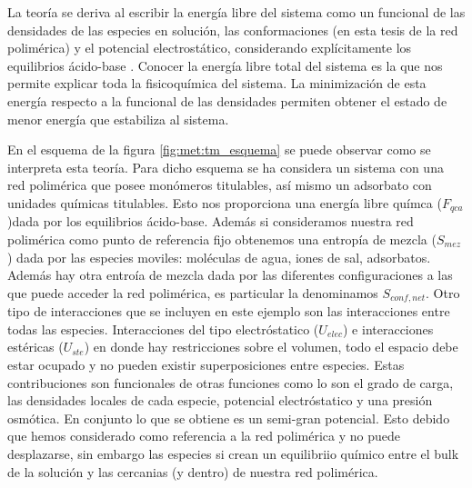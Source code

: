 La teor\'ia se deriva al escribir la energ\'ia libre del sistema como un funcional de las densidades de las especies en soluci\'on, las conformaciones (en esta tesis de la red polim\'erica) y el potencial electrost\'atico, considerando expl\'icitamente los equilibrios \'acido-base . 
Conocer la energ\'ia libre total del sistema es la que nos permite explicar toda la fisicoqu\'imica del sistema.  La minimizaci\'on de esta energ\'ia respecto a la funcional de las densidades permiten obtener el estado de menor energ\'ia que estabiliza al sistema.

En el esquema de la figura \ref{fig:met:tm_esquema} se puede observar como se interpreta esta teor\'ia. Para dicho esquema se ha considera un sistema con una red polim\'erica que posee mon\'omeros titulables, as\'i mismo un adsorbato con unidades qu\'imicas titulables. Esto nos proporciona una energ\'ia libre qu\'imca ($F_{qca}$)dada por los equilibrios \'acido-base.
Adem\'as si consideramos nuestra red polim\'erica como punto de referencia fijo obtenemos una entrop\'ia de mezcla ($S_{mez}$) dada por las especies moviles: mol\'eculas de agua, iones de sal, adsorbatos. Adem\'as hay otra entro\'ia de mezcla dada por las diferentes configuraciones a las que puede acceder la red polim\'erica, es particular la denominamos $S_{conf,net}$.
Otro tipo de interacciones que se incluyen en este ejemplo son las interacciones entre todas las especies. Interacciones del tipo electr\'ostatico ($U_{elec}$) e interacciones est\'ericas ($U_{ste}$) en donde hay restricciones sobre el volumen, todo el espacio debe estar ocupado y no pueden existir superposiciones entre especies. 
Estas contribuciones son funcionales de otras funciones como lo son el grado de carga, las densidades locales de cada especie, potencial electr\'ostatico y una presi\'on osm\'otica. En conjunto lo que se obtiene es un semi-gran potencial. Esto debido que hemos considerado como referencia a la red polim\'erica y no puede desplazarse, sin embargo las especies si crean un equilibriio qu\'imico entre el bulk de la soluci\'on y las cercanias (y dentro) de nuestra red polim\'erica.

